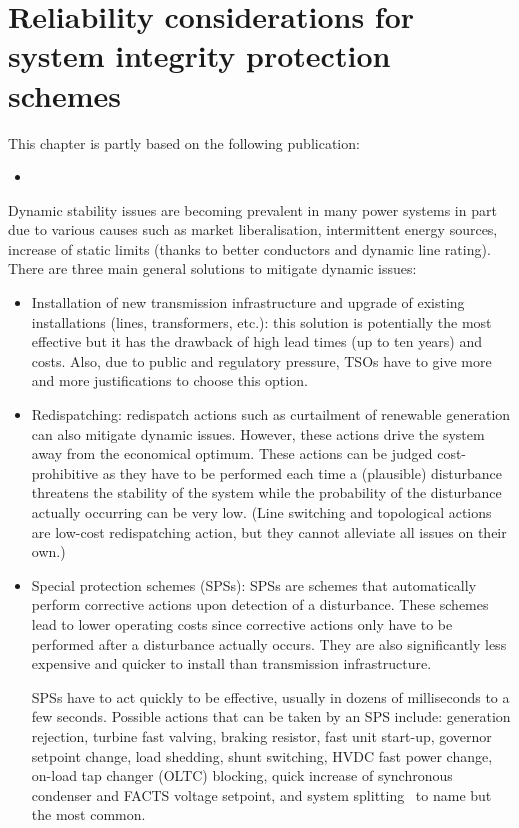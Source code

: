 \chapter{Reliability considerations for system integrity protection schemes}
\label{ch:SPS}
\minitoc

\begin{tcolorbox}[width=\linewidth, sharp corners=all,
    colback=white!80!black,
    colframe=white!80!black]
This chapter is partly based on the following publication:
\begin{itemize}
    \item {}
\end{itemize}
\end{tcolorbox}

Dynamic stability issues are becoming prevalent in many power systems in part due to various causes such as market liberalisation, intermittent energy sources, increase of static limits (thanks to better conductors and dynamic line rating). There are three main general solutions to mitigate dynamic issues:

\begin{itemize}
    \item Installation of new transmission infrastructure and upgrade of existing installations (lines, transformers, etc.): this solution is potentially the most effective but it has the drawback of high lead times (up to ten years) and costs. Also, due to public and regulatory pressure, TSOs have to give more and more justifications to choose this option.
    \item Redispatching: redispatch actions such as curtailment of renewable generation can also mitigate dynamic issues. However, these actions drive the system away from the economical optimum. These actions can be judged cost-prohibitive as they have to be performed each time a (plausible) disturbance threatens the stability of the system while the probability of the disturbance actually occurring can be very low. (Line switching and topological actions are low-cost redispatching action, but they cannot alleviate all issues on their own.)
    \item Special protection schemes (SPSs): SPSs are schemes that automatically perform corrective actions upon detection of a disturbance. These schemes lead to lower operating costs since corrective actions only have to be performed after a disturbance actually occurs. They are also significantly less expensive and quicker to install than transmission infrastructure.

    SPSs have to act quickly to be effective, usually in dozens of milliseconds to a few seconds. Possible actions that can be taken by an SPS include: generation rejection, turbine fast valving, braking resistor, fast unit start-up, governor setpoint change, load shedding, shunt switching, HVDC fast power change, on-load tap changer (OLTC) blocking, quick increase of synchronous condenser and FACTS voltage setpoint, and system splitting~\cite{CigreDefensePlan} to name but the most common.
\end{itemize}

